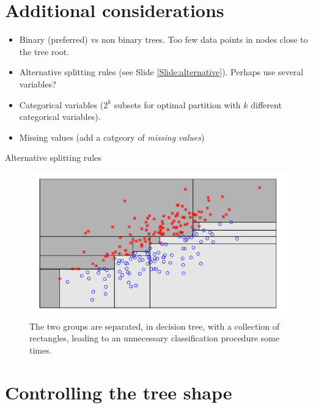 \documentclass{beamer}
\begin{document}
\section{Additional considerations}

\begin{frame}
\begin{itemize}
    \item Binary (preferred) vs non binary trees. Too few data points in nodes close to the tree root.
    \item Alternative splitting rules (see Slide \ref{Slide:alternative}). Perhaps use several variables?
    \item Categorical variables ($2^k$ subsets for optimal partition with $k$ different categorical variables).
    \item Missing values (add a catgeory of {\em missing values})
\end{itemize}
\end{frame}

\begin{frame}{Alternative splitting rules}
    \label{Slide:alternative}
    \begin{figure}
        \includegraphics[width=0.9\linewidth]{F85Kroese}
        \caption{The two groups are separated, in decision tree, with a collection of rectangles, leading to an unnecessary classification procedure some times.\cite{kroese2020}}
    \end{figure}
\end{frame}

\section{Controlling the tree shape}
\end{document}
